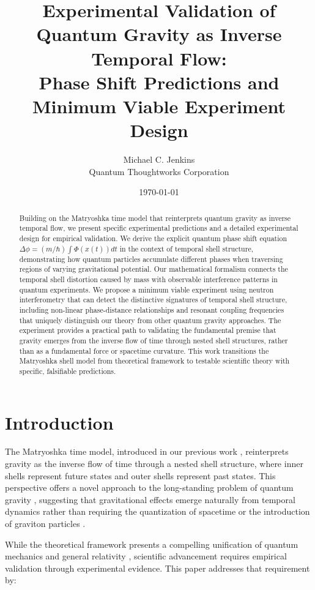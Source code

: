 \documentclass[12pt,a4paper]{article}
\title{Experimental Validation of Quantum Gravity as Inverse Temporal Flow: \\
Phase Shift Predictions and Minimum Viable Experiment Design}
\author{Michael C. Jenkins\\
Quantum Thoughtworks Corporation}
\date{\today}
\begin{document}
\maketitle

\begin{abstract}
Building on the Matryoshka time model that reinterprets quantum gravity as inverse temporal flow, we present specific experimental predictions and a detailed experimental design for empirical validation. We derive the explicit quantum phase shift equation $\Delta \phi = (m/\hbar) \int \Phi(x(t)) dt$ in the context of temporal shell structure, demonstrating how quantum particles accumulate different phases when traversing regions of varying gravitational potential. Our mathematical formalism connects the temporal shell distortion caused by mass with observable interference patterns in quantum experiments. We propose a minimum viable experiment using neutron interferometry that can detect the distinctive signatures of temporal shell structure, including non-linear phase-distance relationships and resonant coupling frequencies that uniquely distinguish our theory from other quantum gravity approaches. The experiment provides a practical path to validating the fundamental premise that gravity emerges from the inverse flow of time through nested shell structures, rather than as a fundamental force or spacetime curvature. This work transitions the Matryoshka shell model from theoretical framework to testable scientific theory with specific, falsifiable predictions.
\end{abstract}

\section{Introduction}

The Matryoshka time model, introduced in our previous work \citep{matryoshka}, reinterprets gravity as the inverse flow of time through a nested shell structure, where inner shells represent future states and outer shells represent past states. This perspective offers a novel approach to the long-standing problem of quantum gravity \citep{string, lqg}, suggesting that gravitational effects emerge naturally from temporal dynamics rather than requiring the quantization of spacetime or the introduction of graviton particles \citep{carroll}.

While the theoretical framework presents a compelling unification of quantum mechanics and general relativity \citep{einstein, hawking}, scientific advancement requires empirical validation through experimental evidence. This paper addresses that requirement by:
\end{document}
